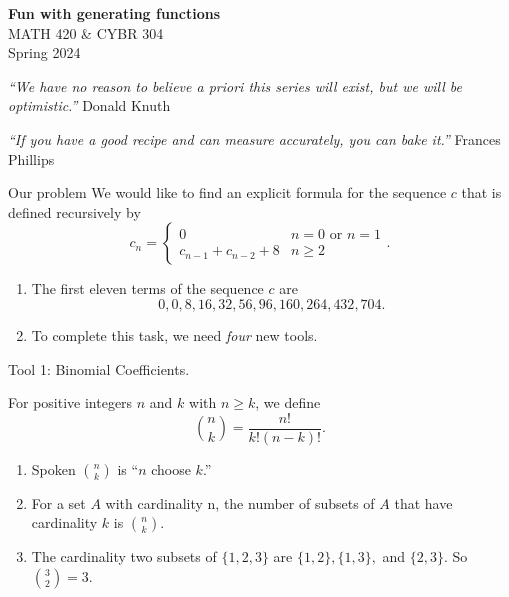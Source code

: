 \documentclass[portrait,fleqn,12pt]{beamer}
\newenvironment{handlist}
   {\begin{enumerate}[\faHandPointRight]
       \addtolength{\itemsep}{0.0\itemsep}}
     {\end{enumerate}}
\begin{document}
\begin{frame}
\begin{flushleft} 
\textbf{Fun with generating functions} \\
MATH 420 \& CYBR 304 \\
Spring 2024 
\end{flushleft}


\emph{“We have no reason to believe a priori this series will exist, but we will be optimistic.”} \hfill{\sc Donald Knuth}

\emph{“If you have a good recipe and can measure accurately, you can bake it.”} \hfill{\sc Frances Phillips}
\end{frame}


\begin{frame}[fragile]{Our problem}
We would like to find an explicit formula for the sequence $c$ that is defined recursively by
\begin{equation}
  c_n= \begin{cases} 0 & n =0 \text{ or } n =1 \\
                                 c_{n-1} + c_{n-2}+ 8 & n \geq 2
           \end{cases}.
\end{equation}
\begin{handlist}
\item The first eleven terms of the sequence $c$ are
\begin{equation}
      0,0,8,16,32,56,96,160,264,432,704.
\end{equation}
\item To complete this task, we need \emph{four} new tools.
\end{handlist}
\end{frame}
\begin{frame}{Tool 1:  Binomial Coefficients.}

For positive integers $n$ and $k$ with $n \geq k$, we define
\begin{equation}
      \binom{n}{k} = \frac{n!}{k! (n-k)!}.
\end{equation}
\begin{handlist}
 \item Spoken $\binom{n}{k}$ is ``$n$ choose $k$.''
 \item For a set $A$ with cardinality n,  the number of subsets of $A$ that have cardinality $k$ is $\binom{n}{k}$.
 \item The cardinality two subsets of $\{1,2,3\}$ are $\{1,2\},\{1,3\},$ and $\{2,3\}$.  So  $\binom{3}{2} = 3$.
\end{handlist}
\end{frame}
\end{document}
